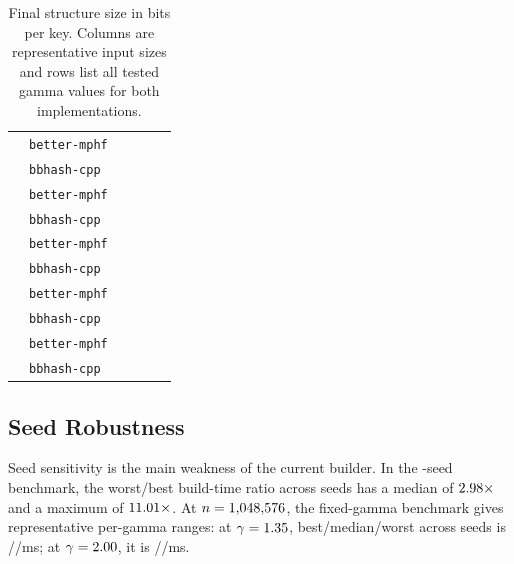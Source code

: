 \documentclass[10pt]{article}
\begin{document}
\begin{table}[!htbp]
\begin{tabular}{r l c c c c}
\PaperBitsGammaFiveLabel{} & \texttt{better-mphf} & \PaperBitsGammaFiveBetterNOne{} & \PaperBitsGammaFiveBetterNTwo{} & \PaperBitsGammaFiveBetterNThree{} & \PaperBitsGammaFiveBetterNFour{} \\
 & \texttt{bbhash-cpp} & \PaperBitsGammaFiveCppNOne{} & \PaperBitsGammaFiveCppNTwo{} & \PaperBitsGammaFiveCppNThree{} & \PaperBitsGammaFiveCppNFour{} \\
\PaperBitsGammaSixLabel{} & \texttt{better-mphf} & \PaperBitsGammaSixBetterNOne{} & \PaperBitsGammaSixBetterNTwo{} & \PaperBitsGammaSixBetterNThree{} & \PaperBitsGammaSixBetterNFour{} \\
 & \texttt{bbhash-cpp} & \PaperBitsGammaSixCppNOne{} & \PaperBitsGammaSixCppNTwo{} & \PaperBitsGammaSixCppNThree{} & \PaperBitsGammaSixCppNFour{} \\
\PaperBitsGammaSevenLabel{} & \texttt{better-mphf} & \PaperBitsGammaSevenBetterNOne{} & \PaperBitsGammaSevenBetterNTwo{} & \PaperBitsGammaSevenBetterNThree{} & \PaperBitsGammaSevenBetterNFour{} \\
 & \texttt{bbhash-cpp} & \PaperBitsGammaSevenCppNOne{} & \PaperBitsGammaSevenCppNTwo{} & \PaperBitsGammaSevenCppNThree{} & \PaperBitsGammaSevenCppNFour{} \\
\PaperBitsGammaEightLabel{} & \texttt{better-mphf} & \PaperBitsGammaEightBetterNOne{} & \PaperBitsGammaEightBetterNTwo{} & \PaperBitsGammaEightBetterNThree{} & \PaperBitsGammaEightBetterNFour{} \\
 & \texttt{bbhash-cpp} & \PaperBitsGammaEightCppNOne{} & \PaperBitsGammaEightCppNTwo{} & \PaperBitsGammaEightCppNThree{} & \PaperBitsGammaEightCppNFour{} \\
\PaperBitsGammaNineLabel{} & \texttt{better-mphf} & \PaperBitsGammaNineBetterNOne{} & \PaperBitsGammaNineBetterNTwo{} & \PaperBitsGammaNineBetterNThree{} & \PaperBitsGammaNineBetterNFour{} \\
 & \texttt{bbhash-cpp} & \PaperBitsGammaNineCppNOne{} & \PaperBitsGammaNineCppNTwo{} & \PaperBitsGammaNineCppNThree{} & \PaperBitsGammaNineCppNFour{} \\
\bottomrule
\end{tabular}
\caption{Final structure size in bits per key. Columns are representative input sizes and rows list all tested gamma values for both implementations.}
\label{tab:bits-per-key}
\end{table}

\subsection{Seed Robustness}
Seed sensitivity is the main weakness of the current builder. In the \PaperSeedCount{}-seed benchmark, the worst/best build-time ratio across seeds has a median of $2.98\times$ and a maximum of $11.01\times$. At $n = 1{,}048{,}576$, the fixed-gamma benchmark gives representative per-gamma ranges: at $\gamma = 1.35$, best/median/worst across \PaperSeedCount{} seeds is \PaperSeedLowBestMs/\PaperSeedLowMedianMs/\PaperSeedLowWorstMs ms; at $\gamma = 2.00$, it is \PaperSeedHighBestMs/\PaperSeedHighMedianMs/\PaperSeedHighWorstMs ms.
\end{document}
